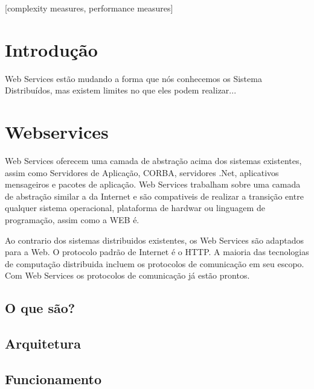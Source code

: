 \documentclass{acm_proc_article-sp}
\begin{document}
[complexity measures, performance measures]



\section{Introdução}
		Web Services estão mudando a forma que nós conhecemos os Sistema Distribuídos, 
		mas existem limites no que eles podem realizar...
		
		
		

\section{Webservices}
		Web Services oferecem uma camada de abstração acima dos sistemas existentes, assim como Servidores de Aplicação, 
		CORBA, servidores .Net, aplicativos mensageiros e pacotes de aplicação. Web Services trabalham sobre 
		uma camada de abstração similar a da Internet e são compativeis de realizar a transição entre qualquer sistema operacional, 
		plataforma de hardwar ou linguagem de programação, assim como a WEB é.
		
		Ao contrario dos sistemas distribuidos existentes, os Web Services são adaptados para a Web. O protocolo padrão de Internet é o HTTP. 
		A maioria das tecnologias de computação distribuida incluem os protocolos de comunicação em seu escopo. 
		Com Web Services os protocolos de comunicação já estão prontos. \cite{UNDERWEBSERVICES}

	\subsection{O que são?}
		
		
		
		
	
	\subsection{Arquitetura}
	
	\subsection{Funcionamento}
	
\end{document}
